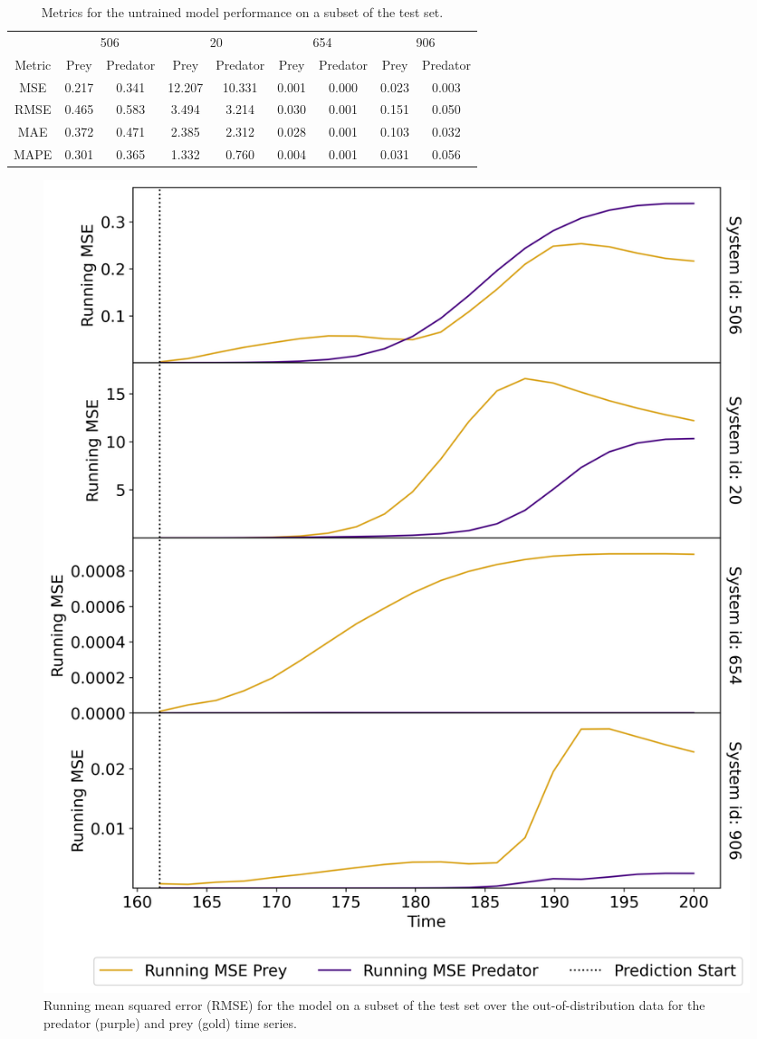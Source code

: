 \documentclass[11pt,a4paper]{article}
\begin{document}
\begin{table}[h]
    \centering
    \begin{tabular}{c|c|c|c|c|c|c|c|c}
        & \multicolumn{2}{c|}{506} & \multicolumn{2}{c|}{20} & \multicolumn{2}{c|}{654} & \multicolumn{2}{|c}{906} \\
        Metric & Prey & Predator & Prey & Predator & Prey & Predator & Prey & Predator \\
        \hline
        MSE & 0.217 & 0.341 & 12.207 & 10.331 & 0.001 & 0.000 & 0.023 & 0.003 \\
        RMSE & 0.465 & 0.583 & 3.494 & 3.214 & 0.030 & 0.001 & 0.151 & 0.050 \\
        MAE & 0.372 & 0.471 & 2.385 & 2.312 & 0.028 & 0.001 & 0.103 & 0.032 \\
        MAPE & 0.301 & 0.365 & 1.332 & 0.760 & 0.004 & 0.001 & 0.031 & 0.056 \\
    \end{tabular}
    \caption{Metrics for the untrained model performance on a subset of the test set.}
    \label{tab:baseline}
\end{table}

\begin{figure}
    \centering
    \includegraphics[width=\columnwidth, keepaspectratio]{../plots/running_mse_example.png}
    \caption{Running mean squared error (RMSE) for the model on a subset of the test set over the out-of-distribution data for the predator (purple) and prey (gold) time series.}
    \label{fig:baseline_rmse}
\end{figure}
\end{document}
